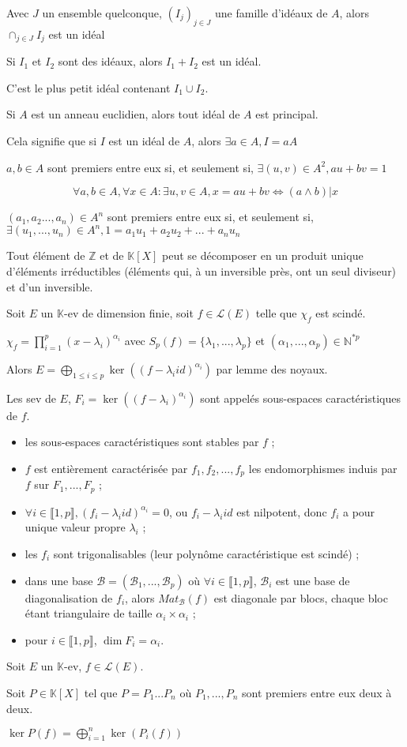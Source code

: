 \documentclass[a4paper,12pt]{book}
\newcommand{\Def}[2]{\begin{tcolorbox}[colback=white,colframe=red!10!green!20!blue!75!, title=Définition : #1]#2\end{tcolorbox}}
\newcommand{\Thr}[2]{\begin{tcolorbox}[sharp corners, colback=white,colframe=red!10!blue!30!green!75!, title=Théorème : #1]#2\end{tcolorbox}}
\def\N{\mathbb{N}}
\def\Z{\mathbb{Z}}
\def\K{\mathbb{K}}
\begin{document}
\Thr{}{Avec $J$ un ensemble quelconque, $(I_j)_{j\in J}$ une famille d'idéaux de $A$, alors $\cap_{j\in J} I_j$ est un idéal}
\Thr{}{Si $I_1$ et $I_2$ sont des idéaux, alors $I_1+I_2$ est un idéal.
\par C'est le plus petit idéal contenant $I_1\cup I_2$.}
\Thr{}{Si $A$ est un anneau euclidien, alors tout idéal de $A$ est principal.
\par Cela signifie que si $I$ est un idéal de $A$, alors $\exists a\in A, I = aA$}
\Thr{Bézout}{$a,b\in A$ sont premiers entre eux si, et seulement si, $\exists (u,v)\in A^2, au+bv=1$}
\Thr{Bézout étendu}{$$\forall a,b\in A, \forall x\in A : \exists u,v\in A, x=au+bv \Leftrightarrow (a\wedge b)\vert x$$}
\Thr{Bézout généralisé}{$(a_1,a_2...,a_n)\in A^n$ sont premiers entre eux si, et seulement si, $\exists (u_1,...,u_n)\in A^n, 1=a_1u_1+a_2u_2+...+a_nu_n$}
\Thr{}{Tout élément de $\Z$ et de $\K[X]$ peut se décomposer en un produit unique d'éléments irréductibles (éléments qui, à un inversible près, ont un seul diviseur) et d'un inversible.}

\Def{Espaces caractéristiques}{Soit $E$ un $\K$-ev de dimension finie, soit $f\in\mathcal{L}(E)$ telle que $\chi_f$ est scindé. \par $\chi_f = \prod\limits_{i=1}^p(x-\lambda_i)^{\alpha_i}$ avec $S_p(f)=\{\lambda_1,...,\lambda_p\}$ et $(\alpha_1,...,\alpha_p)\in\N^{*p}$ \par Alors $E=\bigoplus\limits_{1\leq i\leq p}\ker((f-\lambda_iid)^{\alpha_i})$ par lemme des noyaux.
\par Les sev de $E$, $F_i = \ker((f-\lambda_i)^{\alpha_i})$ sont appelés sous-espaces caractéristiques de $f$.\begin{itemize}
\item les sous-espaces caractéristiques sont stables par $f$ ;
\item $f$ est entièrement caractérisée par $f_1,f_2,...,f_p$ les endomorphismes induis par $f$ sur $F_1,...,F_p$ ;
\item $\forall i\in\llbracket 1,p\rrbracket, (f_i-\lambda_iid)^{\alpha_i}=0$, ou $f_i-\lambda_iid$ est nilpotent, donc $f_i$ a pour unique valeur propre $\lambda_i$ ;
\item les $f_i$ sont trigonalisables (leur polynôme caractéristique est scindé) ;
\item dans une base $\mathcal{B}=(\mathcal{B}_1,...,\mathcal{B}_p)$ où $\forall i\in\llbracket 1,p\rrbracket$, $\mathcal{B}_i$ est une base de diagonalisation de $f_i$, alors $Mat_\mathcal{B}(f)$ est diagonale par blocs, chaque bloc étant triangulaire de taille $\alpha_i\times \alpha_i$ ;
\item pour $i\in\llbracket 1,p\rrbracket$, $\dim F_i = \alpha_i$.
\end{itemize}}
\Thr{Lemme des noyaux}{Soit $E$ un $\K$-ev, $f\in \mathcal{L}(E)$.
\par Soit $P\in \K[X]$ tel que $P=P_1...P_n$ où $P_1,...,P_n$ sont premiers entre eux deux à deux.
\par $\ker P(f) = \bigoplus\limits_{i=1}^n\ker(P_i(f))$}
\end{document}
